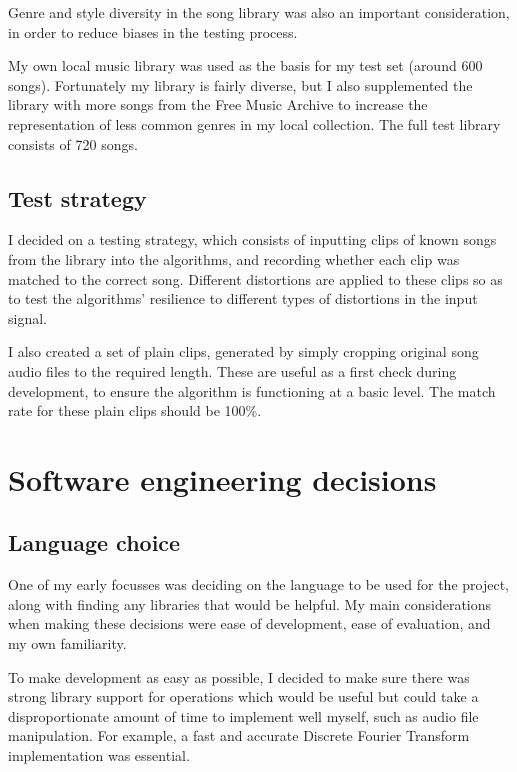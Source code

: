 \documentclass[12pt,a4paper,twoside,openright]{report}
\begin{document}
Genre and style diversity in the song library was also an important consideration, in order to reduce biases in the testing process.

My own local music library was used as the basis for my test set (around 600 songs). Fortunately my library is fairly diverse, but I also supplemented the library with more songs from the Free Music Archive to increase the representation of less common genres in my local collection. The full test library consists of 720 songs.

\subsection{Test strategy}

I decided on a testing strategy, which consists of inputting clips of known songs from the library into the algorithms, and recording whether each clip was matched to the correct song. Different distortions are applied to these clips so as to test the algorithms' resilience to different types of distortions in the input signal.

I also created a set of plain clips, generated by simply cropping original song audio files to the required length. These are useful as a first check during development, to ensure the algorithm is functioning at a basic level. The match rate for these plain clips should be 100\%.


\section{Software engineering decisions}

\subsection{Language choice}

One of my early focusses was deciding on the language to be used for the project, along with finding any libraries that would be helpful. My main considerations when making these decisions were ease of development, ease of evaluation, and my own familiarity.

To make development as easy as possible, I decided to make sure there was strong library support for operations which would be useful but could take a disproportionate amount of time to implement well myself, such as audio file manipulation. For example, a fast and accurate Discrete Fourier Transform implementation was essential.
\end{document}
